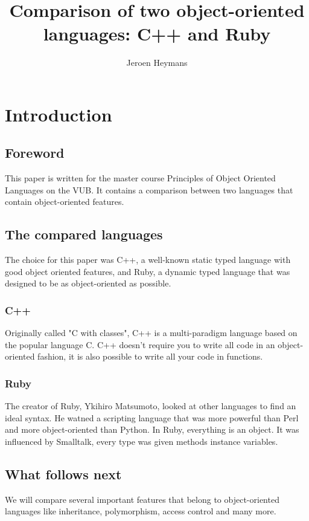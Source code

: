 \documentclass[10pt,a4paper,twocolumn]{article}
\author{Jeroen Heymans}
\title{Comparison of two object-oriented languages: C++ and Ruby}
\begin{document}
\maketitle

\section{Introduction}

\subsection{Foreword}
This paper is written for the master course Principles of Object Oriented Languages on the VUB. It contains a comparison between two languages that contain object-oriented features. 

\subsection{The compared languages}
The choice for this paper was C++, a well-known static typed language with good object oriented features, and Ruby, a dynamic typed language that was designed to be as object-oriented as possible.

\subsubsection{C++}
Originally called "C with classes", C++ is a multi-paradigm language based on the popular language C. C++ doesn't require you to write all code in an object-oriented fashion, it is also possible to write all your code in functions.

\subsubsection{Ruby}
The creator of Ruby, Ykihiro Matsumoto, looked at other languages to find an ideal syntax. He watned a scripting language that was more powerful than Perl and more object-oriented than Python. In Ruby, everything is an object. It was influenced by Smalltalk, every type was given methods instance variables.

\subsection{What follows next}
We will compare several important features that belong to object-oriented languages like inheritance, polymorphism, access control and many more.
\end{document}
